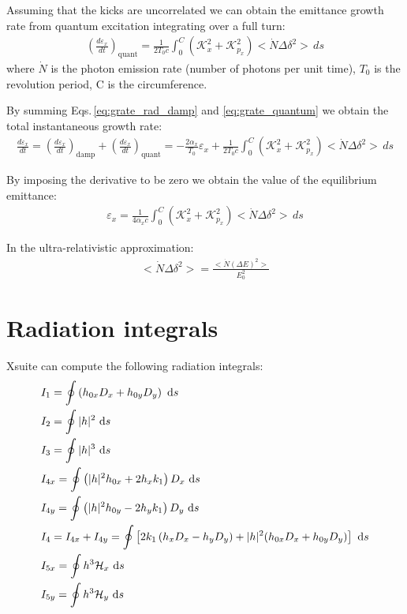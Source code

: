 Assuming that the kicks are uncorrelated we can obtain the emittance growth rate from quantum excitation integrating over a full turn:
\begin{align}
\left(\frac {d\varepsilon_x}{dt} \right)_\text{quant}= 
\frac{1}{2T_0c}\int_0^C\left(\mathcal{K}^2_x + \mathcal{K}^2_{p_x}\right)<\dot{N} \Delta \delta^2> \,ds
\label{eq:grate_quantum}
\end{align}
where $\dot{N}$ is the photon emission rate (number of photons per unit time), $T_0$ is the revolution period, C is the circumference.

By summing Eqs.\,\ref{eq:grate_rad_damp} and \ref{eq:grate_quantum} we obtain the total instantaneous growth rate:
\begin{align}
\frac {d\varepsilon_x}{dt} = 
\left(\frac {d\varepsilon_x}{dt}\right)_\text{damp}
+
\left(\frac {d\varepsilon_x}{dt}\right)_\text{quant}
=
- \frac{2\alpha_x}{T_0}  \varepsilon_x
+
\frac{1}{2T_0c}\int_0^C\left(\mathcal{K}^2_x + \mathcal{K}^2_{p_x}\right)<\dot{N} \Delta \delta^2> \,ds
\end{align}

By imposing the derivative to be zero we obtain the value of the equilibrium emittance:
\begin{align}
\varepsilon_x= 
\frac{1}{4\alpha_xc}\int_0^C\left(\mathcal{K}^2_x + \mathcal{K}^2_{p_x}\right)<\dot{N} \Delta \delta^2> \,ds
\label{eq:equilemi1}
\end{align}

In the ultra-relativistic approximation:
\begin{align}
<\dot{N} \Delta \delta^2> = 
\frac{<\dot{N} (\Delta E)^2>}{E_0^2}
\label{eq:equilemi2}
\end{align}

\section{Radiation integrals}

Xsuite can compute the following radiation integrals:
\begin{align}
    &I_1 = \oint \left( h_{0x} D_x + h_{0y} D_y \right)\ \dee s\\
    &I_2 = \oint |h|^2 \ \dee s\\
    &I_3 = \oint |h|^3 \ \dee s\\
    &I_{4x} = \oint \left( |h|^2 h_{0x} + 2 h_x k_1 \right) D_x\ \dee s\\
    &I_{4y} = \oint \left( |h|^2 h_{0y} - 2 h_y k_1 \right) D_y\ \dee s\\
    &I_4 = I_{4x} + I_{4y} = \oint \left[ 2k_1 \left( h_x D_x - h_y D_y \right) + |h|^2 (h_{0x}D_x + h_{0y} D_y) \right] \ \dee s\\
    &I_{5x} = \oint h^3 \curlyH_x\ \dee s\\
    &I_{5y} = \oint h^3 \curlyH_y\ \dee s
\end{align}

